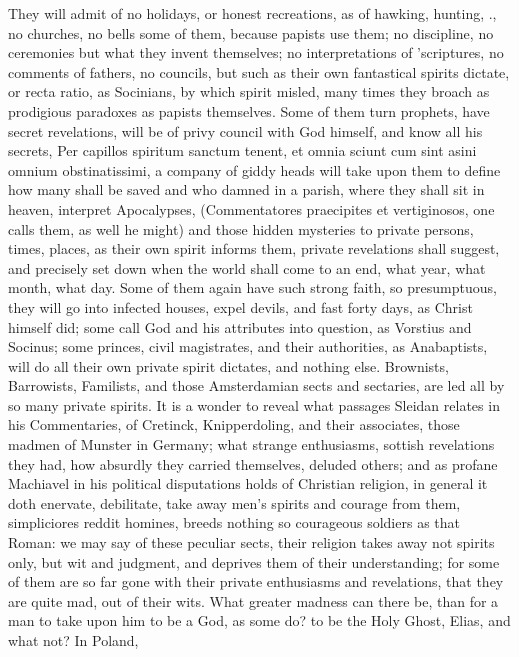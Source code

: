 {They will admit of no holidays, or honest recreations, as of hawking,
hunting, \etc{}., no churches, no bells some of them, because papists use
them; no discipline, no ceremonies but what they invent themselves; no
interpretations of 'scriptures, no comments of fathers, no councils,
but such as their own fantastical spirits dictate, or recta ratio, as
Socinians, by which spirit misled, many times they broach as prodigious
paradoxes as papists themselves. Some of them turn prophets, have
secret revelations, will be of privy council with God himself, and know
all his secrets,  Per capillos spiritum sanctum tenent, et omnia
sciunt cum sint asini omnium obstinatissimi, a company of giddy heads
will take upon them to define how many shall be saved and who damned in
a parish, where they shall sit in heaven, interpret Apocalypses,
(Commentatores praecipites et vertiginosos, one calls them, as well he
might) and those hidden mysteries to private persons, times, places, as
their own spirit informs them, private revelations shall suggest, and
precisely set down when the world shall come to an end, what year, what
month, what day. Some of them again have such strong faith, so
presumptuous, they will go into infected houses, expel devils, and fast
forty days, as Christ himself did; some call God and his attributes
into question, as Vorstius and Socinus; some princes, civil
magistrates, and their authorities, as Anabaptists, will do all their
own private spirit dictates, and nothing else. Brownists, Barrowists,
Familists, and those Amsterdamian sects and sectaries, are led all by
so many private spirits. It is a wonder to reveal what passages Sleidan
relates in his Commentaries, of Cretinck, Knipperdoling, and their
associates, those madmen of Munster in Germany; what strange
enthusiasms, sottish revelations they had, how absurdly they carried
themselves, deluded others; and as profane Machiavel in his political
disputations holds of Christian religion, in general it doth enervate,
debilitate, take away men's spirits and courage from them, simpliciores
reddit homines, breeds nothing so courageous soldiers as that Roman: we
may say of these peculiar sects, their religion takes away not spirits
only, but wit and judgment, and deprives them of their understanding;
for some of them are so far gone with their private enthusiasms and
revelations, that they are quite mad, out of their wits. What greater
madness can there be, than for a man to take upon him to be a God, as
some do? to be the Holy Ghost, Elias, and what not? In Poland,
}
